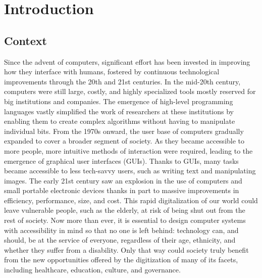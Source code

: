 \chapter{Introduction} \label{chap:introduction}
\section{Context} \label{sec:introduction:context}
Since the advent of computers, significant effort has been invested in improving how they interface with humans, fostered by continuous technological improvements through the 20th and 21st centuries.
%
In the mid-20th century, computers were still large, costly, and highly specialized tools mostly reserved for big institutions and companies. The emergence of high-level programming languages vastly simplified the work of researchers at these institutions by enabling them to create complex algorithms without having to manipulate individual bits. 
%
From the 1970s onward, the user base of computers gradually expanded to cover a broader segment of society. As they became accessible to more people, more intuitive methods of interaction were required, leading to the emergence of graphical user interfaces (GUIs).
%
Thanks to GUIs, many tasks became accessible to less tech-savvy users, such as writing text and manipulating images.
%
The early 21st century saw an explosion in the use of computers and small portable electronic devices thanks in part to massive improvements in efficiency, performance, size, and cost. 
%
This rapid digitalization of our world could leave vulnerable people, such as the elderly, at risk of being shut out from the rest of society. Now more than ever, it is essential to design computer systems with accessibility in mind so that no one is left behind: technology can, and should, be at the service of everyone, regardless of their age, ethnicity, and whether they suffer from a disability. Only that way could society truly benefit from the new opportunities offered by the digitization of many of its facets, including healthcare, education, culture, and governance.

